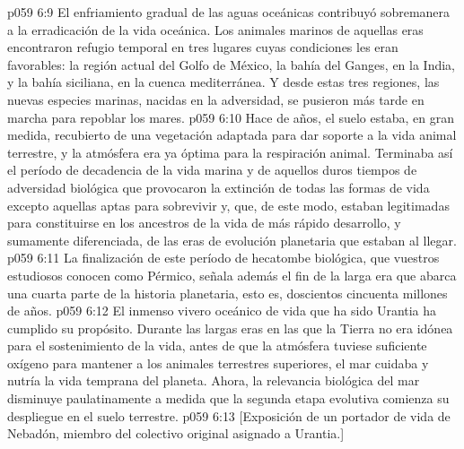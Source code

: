 \vs p059 6:9 El enfriamiento gradual de las aguas oceánicas contribuyó sobremanera a la erradicación de la vida oceánica. Los animales marinos de aquellas eras encontraron refugio temporal en tres lugares cuyas condiciones les eran favorables: la región actual del Golfo de México, la bahía del Ganges, en la India, y la bahía siciliana, en la cuenca mediterránea. Y desde estas tres regiones, las nuevas especies marinas, nacidas en la adversidad, se pusieron más tarde en marcha para repoblar los mares.
\vs p059 6:10 \pc Hace  de años, el suelo estaba, en gran medida, recubierto de una vegetación adaptada para dar soporte a la vida animal terrestre, y la atmósfera era ya óptima para la respiración animal. Terminaba así el período de decadencia de la vida marina y de aquellos duros tiempos de adversidad biológica que provocaron la extinción de todas las formas de vida excepto aquellas aptas para sobrevivir y, que, de este modo, estaban legitimadas para constituirse en los ancestros de la vida de más rápido desarrollo, y sumamente diferenciada, de las eras de evolución planetaria que estaban al llegar.
\vs p059 6:11 La finalización de este período de hecatombe biológica, que vuestros estudiosos conocen como Pérmico, señala además el fin de la larga era  que abarca una cuarta parte de la historia planetaria, esto es, doscientos cincuenta millones de años.
\vs p059 6:12 El inmenso vivero oceánico de vida que ha sido Urantia ha cumplido su propósito. Durante las largas eras en las que la Tierra no era idónea para el sostenimiento de la vida, antes de que la atmósfera tuviese suficiente oxígeno para mantener a los animales terrestres superiores, el mar cuidaba y nutría la vida temprana del planeta. Ahora, la relevancia biológica del mar disminuye paulatinamente a medida que la segunda etapa evolutiva comienza su despliegue en el suelo terrestre.
\vsetoff
\vs p059 6:13 [Exposición de un portador de vida de Nebadón, miembro del colectivo original asignado a Urantia.]
